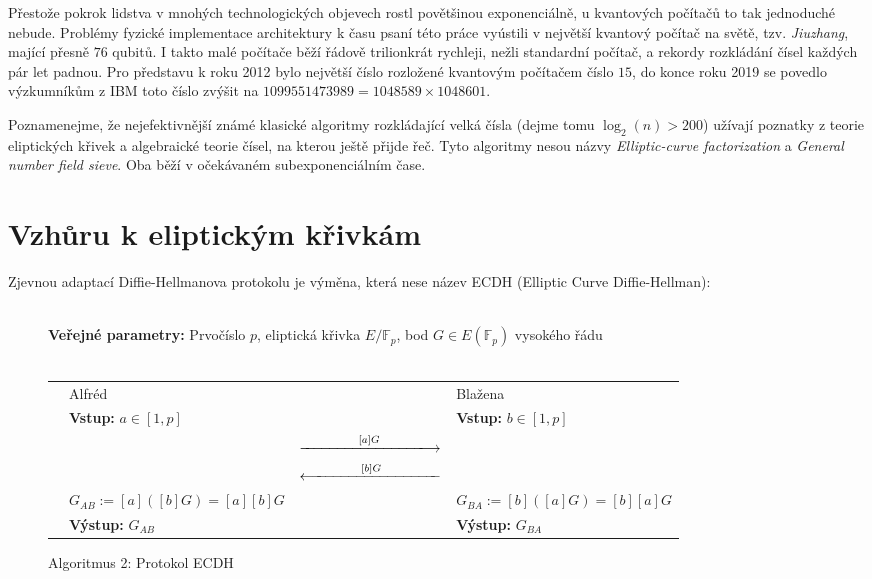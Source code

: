 \documentclass[12pt]{report}
\begin{document}
Přestože pokrok lidstva v mnohých technologických objevech rostl povětšinou exponenciálně, u kvantových počítačů to tak jednoduché nebude. Problémy fyzické implementace architektury k času psaní této práce vyústili v největší kvantový počítač na světě, tzv. \textit{Jiuzhang}, mající přesně $76$ qubitů. I takto malé počítače běží řádově trilionkrát rychleji, nežli standardní počítač, a rekordy rozkládání čísel každých pár let padnou. Pro představu k roku 2012 bylo největší číslo rozložené kvantovým počítačem číslo $15$, do konce roku 2019 se povedlo výzkumníkům z IBM \cite{Karamlou} toto číslo zvýšit na $1099551473989 = 1048589 \times 1048601$.

Poznamenejme, že nejefektivnější známé klasické algoritmy rozkládající velká čísla (dejme tomu $\log_2(n)>200$) užívají poznatky z teorie eliptických křivek a algebraické teorie čísel, na kterou ještě přijde řeč. Tyto algoritmy nesou názvy \textit{Elliptic-curve factorization} a \textit{General number field sieve}. Oba běží v očekávaném subexponenciálním čase.

\section{Vzhůru k eliptickým křivkám}


Zjevnou adaptací Diffie-Hellmanova protokolu je výměna, která nese název ECDH (Elliptic Curve Diffie-Hellman):
\begin{figure}[h]
\begin{center} 
\makebox[1cm]{\rule{17.3cm}{0.4pt}}\\
\hspace{-1.35cm} \textbf{Veřejné parametry:} Prvočíslo $p$, eliptická křivka $E/\mathbb{F}_p$, bod $G \in E(\mathbb{F}_p)$ vysokého řádu\\

\vspace{-0.25cm}
\makebox[\linewidth]{\rule{17.3cm}{0.4pt}}\\
\vspace{0.2cm}
\begin{tabular}{l l c l}
\cline{2-2} \cline{4-4} 
& Alfréd & & Blažena \\ 
\cline{2-2} \cline{4-4} 
& \textbf{Vstup:} $a \in [1,p]$ & & \textbf{Vstup:} $b\in [1,p]$ \\
 & & $ \xlongrightarrow{\qquad \qquad  [a]G \qquad \qquad}$  &  \\
&  & $\xlongleftarrow{\qquad \qquad  [b]G \qquad \qquad}$   &  \\
& $G_{AB} := [a]([b]G) = [a][b]G$ &  & $ G_{BA} := [b]([a]G) = [b][a]G$ \\
& \textbf{Výstup:} $G_{AB}$ & & \textbf{Výstup:} $G_{BA}$
\end{tabular}
\caption*{Algoritmus 2: Protokol ECDH}

\end{center}
\end{figure}
\end{document}
